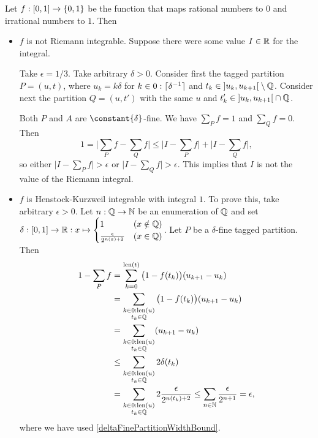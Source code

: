 \begin{example}
Let $f: \interval{0,1}\to \{0,1\}$ be the function that maps rational numbers to $0$ and irrational numbers to $1$. Then
\begin{itemize}
\item $f$ is not Riemann integrable. Suppose there were some value $I\in \mathbb{R}$ for the integral.

Take $\epsilon = 1/3$. Take arbitrary $\delta > 0$. Consider first the tagged partition $P = (u,t)$, where $u_k = k\delta$ for $k\in 0:\lceil\delta^{-1}\rceil$ and $t_k \in \interval[o]{u_k, u_{k+1}}\setminus \Q$.
Consider next the partition $Q = (u,t')$ with the same $u$ and $t'_k \in \interval[o]{u_k, u_{k+1}}\cap \Q$. 

Both $P$ and $A$ are $\constant{\delta}$-fine. We have $\sum_P f = 1$ and $\sum_Q f = 0$. Then
\[ 1 = \Big|\sum_P f - \sum_Q f\Big| \leq \Big|I - \sum_P f\Big| + \Big|I - \sum_Q f\Big|, \]
so either $\Big|I - \sum_P f\Big| > \epsilon$ or $\Big|I - \sum_Q f\Big| > \epsilon$. This implies that $I$ is not the value of the Riemann integral.
\item $f$ is Henstock-Kurzweil integrable with integral $1$. To prove this, take arbitrary $\epsilon > 0$. Let $n: \mathbb{Q}\to \mathbb{N}$ be an enumeration of $\mathbb{Q}$ and set $\delta: \interval{0,1}\to \R: x \mapsto \begin{cases}
1 & (x\notin \Q) \\ \frac{\epsilon}{2^{n(x)+2}} & (x\in \Q)
\end{cases}$. Let $P$ be a $\delta$-fine tagged partition. Then 
\begin{align*}
1 - \sum_P f &= \sum_{k=0}^{\operatorname{len}(t)}\big(1 - f(t_k)\big)(u_{k+1} - u_k) \\
&= \sum_{\substack{k\in 0:\operatorname{len}(u) \\ t_k\in \mathbb{Q}}}\big(1 - f(t_k)\big)(u_{k+1} - u_k) \\
&= \sum_{\substack{k\in 0:\operatorname{len}(u) \\ t_k\in \mathbb{Q}}}(u_{k+1} - u_k) \\
&\leq \sum_{\substack{k\in 0:\operatorname{len}(u) \\ t_k\in \mathbb{Q}}}2\delta(t_k) \\
&= \sum_{\substack{k\in 0:\operatorname{len}(u) \\ t_k\in \mathbb{Q}}}2\frac{\epsilon}{2^{n(t_k)+2}} \leq \sum_{n\in \mathbb{N}}\frac{\epsilon}{2^{n+1}} = \epsilon,
\end{align*}
where we have used \ref{deltaFinePartitionWidthBound}.
\end{itemize}
\end{example}

